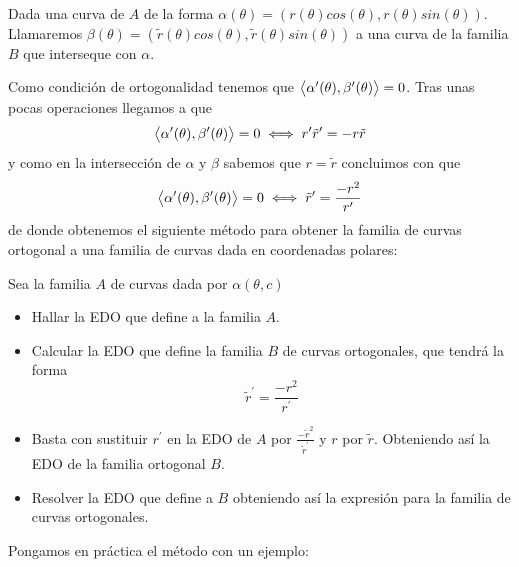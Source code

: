 \documentclass{mathnotes}
\begin{document}
Dada una curva de $A$ de la forma $\alpha(\theta) = (r(\theta)cos(\theta), r(\theta)sin(\theta))$. Llamaremos $\beta(\theta) = (\tilde{r}(\theta)cos(\theta), \tilde{r}(\theta)sin(\theta))$ a una curva de la familia $B$ que interseque con $\alpha$.

Como condición de ortogonalidad tenemos que $\left\langle \alpha^\prime(\theta),\beta^\prime(\theta)\right\rangle = 0$.
Tras unas pocas operaciones llegamos a que $$\left\langle \alpha^\prime(\theta),\beta^\prime(\theta)\right\rangle = 0 \iff r^\prime \tilde{r}^\prime = -r\tilde{r}$$ y como en la intersección de $\alpha$ y $\beta$ sabemos que $r = \tilde{r}$ concluimos con que $$\left\langle \alpha^\prime(\theta),\beta^\prime(\theta)\right\rangle = 0 \iff \tilde{r}^\prime = \frac{-r^2}{r^\prime}$$ de donde obtenemos el siguiente método para obtener la familia de curvas ortogonal a una familia de curvas dada en coordenadas polares:

\begin{method}
Sea la familia $A$ de curvas dada por $\alpha(\theta, c)$
\begin{itemize}
\item Hallar la EDO que define a la familia $A$.
\item Calcular la EDO que define la familia $B$ de curvas ortogonales, que tendrá la forma $$ \tilde{r}^\prime = \frac{-r^2}{r^\prime}$$
\item Basta con sustituir $r^\prime$ en la EDO de $A$ por $\frac{-\tilde{r}^2}{\tilde{r}^\prime}$ y $r$ por $\tilde{r}$. Obteniendo así la EDO de la familia ortogonal $B$.
\item Resolver la EDO que define a $B$ obteniendo así la expresión para la familia de curvas ortogonales.
\end{itemize}
\end{method}

Pongamos en práctica el método con un ejemplo:

\end{document}
